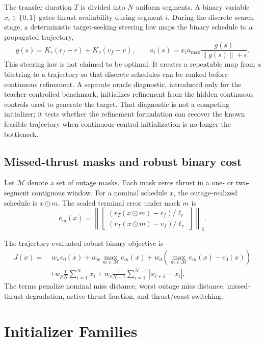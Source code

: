 \documentclass[preprint,12pt]{elsarticle}
\begin{document}
The transfer duration $T$ is divided into $N$ uniform segments. A binary variable $x_i\in\{0,1\}$ gates thrust availability during segment $i$. During the discrete search stage, a deterministic target-seeking steering law maps the binary schedule to a propagated trajectory,
\begin{equation}
g(s) = K_r(r_f-r) + K_v(v_f-v),\qquad
a_i(s) = x_i a_{\max}\frac{g(s)}{\|g(s)\|+\epsilon}.
\end{equation}
This steering law is not claimed to be optimal. It creates a repeatable map from a bitstring to a trajectory so that discrete schedules can be ranked before continuous refinement. A separate oracle diagnostic, introduced only for the teacher-controlled benchmark, initializes refinement from the hidden continuous controls used to generate the target. That diagnostic is not a competing initializer; it tests whether the refinement formulation can recover the known feasible trajectory when continuous-control initialization is no longer the bottleneck.

\subsection{Missed-thrust masks and robust binary cost}

Let $\mathcal{M}$ denote a set of outage masks. Each mask zeros thrust in a one- or two-segment contiguous window. For a nominal schedule $x$, the outage-realized schedule is $x\odot m$. The scaled terminal error under mask $m$ is
\begin{equation}
e_m(x)=
\left\|\begin{bmatrix}
(r_T(x\odot m)-r_f)/\ell_r\\
(v_T(x\odot m)-v_f)/\ell_v
\end{bmatrix}\right\|_2.
\end{equation}

The trajectory-evaluated robust binary objective is
\begin{align}
J(x) = &\; w_n e_0(x) + w_w \max_{m\in\mathcal{M}} e_m(x)
+ w_d\left(\max_{m\in\mathcal{M}} e_m(x)-e_0(x)\right) \nonumber\\
&+ w_p\frac{1}{N}\sum_{i=1}^{N}x_i
+ w_s\frac{1}{N-1}\sum_{i=1}^{N-1}|x_{i+1}-x_i|.
\end{align}
The terms penalize nominal miss distance, worst outage miss distance, missed-thrust degradation, active thrust fraction, and thrust/coast switching.

\section{Initializer Families}
\end{document}
